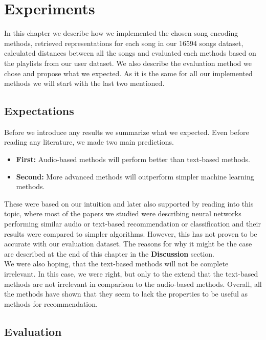\chapter{Experiments}

In this chapter we describe how we implemented the chosen song encoding methods, retrieved representations for each song in our 16594 songs dataset, calculated distances between all the songs and evaluated each methods based on the playlists from our user dataset. We also describe the evaluation method we chose and propose what we expected. As it is the same for all our implemented methods we will start with the last two mentioned. 
\section{Expectations}

Before we introduce any results we summarize what we expected. Even before reading any literature, we made two main predictions. 
\begin{itemize}
    \item \textbf{First:} Audio-based methods will perform better than text-based methods.
    \item \textbf{Second:} More advanced methods will outperform simpler machine learning methods.
\end{itemize}
These were based on our intuition and later also supported by reading into this topic, where most of the papers we studied were describing neural networks performing similar audio or text-based recommendation or classification and their results were compared to simpler algorithms. However, this has not proven to be accurate with our evaluation dataset. The reasons for why it might be the case are described at the end of this chapter in the \textbf{Discussion} section. \\
We were also hoping, that the text-based methods will not be complete irrelevant. In this case, we were right, but only to the extend that the text-based methods are not irrelevant in comparison to the audio-based methods. Overall, all the methods have shown that they seem to lack the properties to be useful as methods for recommendation.
\section{Evaluation}

